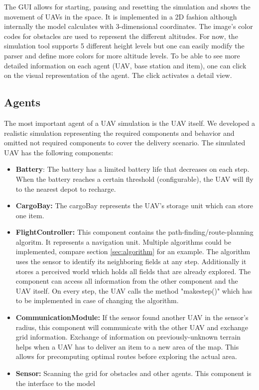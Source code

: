 The GUI allows for starting, pausing and resetting the simulation and shows the movement of UAVs in the space. It is implemented in a 2D fashion although internally the model calculates with 3-dimensional coordinates. The image's color codes for obstacles are used to represent the different altitudes. For now, the simulation tool supports 5 different height levels but one can easily modify the parser and define more colors for more altitude levels.
To be able to see more detailed information on each agent (UAV, base station and item), one can click on the visual representation of the agent. The click activates a detail view. 



\subsection{Agents}\label{sec:UAV}
The most important agent of a UAV simulation is the UAV itself. We developed a realistic simulation representing the required components and behavior and omitted not required components to cover the delivery scenario. The simulated UAV has the following components:
	\begin{itemize}
			\item \textbf{Battery}: The battery has a limited battery life that decreases on each step. When the battery reaches a certain threshold (configurable), the UAV will fly to the nearest depot to recharge.
					\item \textbf{CargoBay:} The cargoBay represents the UAV's storage unit which can store one item.
		\item \textbf{FlightController:} This component contains the path-finding/route-planning algoritm. It represents a navigation unit. Multiple algorithms could be implemented, compare section \ref{sec:algorithm} for an example. The algorithm uses the sensor to identify its neighboring fields at any step. Additionally it stores a perceived world which holds all fields that are already explored. The component can access all information from the other component and the UAV itself. On every step, the UAV calls the method "make\textunderscore step()" which has to be implemented in case of changing the algorithm.
		\item \textbf{CommunicationModule:} If the sensor found another UAV in the sensor's radius, this component will communicate with the other UAV and exchange grid information. Exchange of information on previously-unknown terrain helps when a UAV has to deliver an item to a new area of the map. This allows for precomputing optimal routes before exploring the actual area.
		\item \textbf{Sensor:} Scanning the grid for obstacles and other agents. This component is the interface to the model
	\end{itemize}


